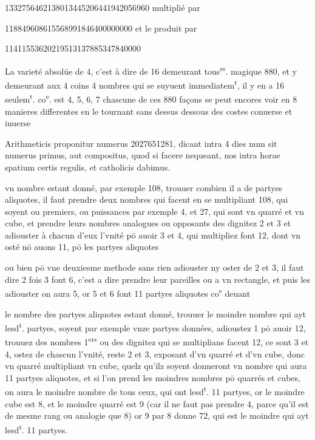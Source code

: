 \documentclass[11pt,a4paper]{article}
\begin{document}
1332756462138013445206441942056960 multiplié par

118849608615568991846400000000 et le produit par

11411553620219513137885347840000

La varieté absolüe de 4, c'est à dire de 16 demeurant tous\textsuperscript{rs}. magique  880, et y demeurant aux 4 coins 4 nombres qui se suyuent immediatem\textsuperscript{t}, il y en a 16 seulem\textsuperscript{t}. co\textsuperscript{e}. est 4, 5, 6, 7 chascune de ces 880 façons se peut encores voir en 8 manieres differentes en le tournant sans dessus dessous des costes conuerse et inuerse

Arithmeticis proponitur numerus 2027651281, dicant intra 4 dies num sit numerus primus, aut compositus, quod si facere nequeant, nos intra horae spatium certis regulis, et catholicis dabimus.

vn nombre estant donné, par exemple 108, trouuer combien il a de partyes aliquotes, il faut prendre deux nombres qui facent en se multipliant 108, qui soyent ou premiers, ou puissances par exemple 4, et 27, qui sont vn quarré et vn cube, et prendre leurs nombres analogues ou opposants des dignitez 2 et 3 et adiouster à chacun d'eux l'vnité pō auoir 3 et 4, qui multipliez font 12, dont vn osté nō auons 11, pō les partyes aliquotes

ou bien pō vne deuxiesme methode sans rien adiouster ny oster de 2 et 3, il faut dire 2 fois 3 font 6, c'est a dire prendre leur pareilles ou a vn rectangle, et puis les adiouster on aura 5, or 5 et 6 font 11 partyes aliquotes co\textsuperscript{e} deuant

le nombre des partyes aliquotes estant donné, trouuer le moindre nombre qui ayt lesd\textsuperscript{t}. partyes, soyent par exemple vnze partyes données, adioustez 1 pō auoir 12, trouuez des nombres 1\textsuperscript{ers} ou des dignitez qui se multiplians facent 12, ce sont 3 et 4, ostez de chascun l'vnité, reste 2 et 3, exposant d'vn quarré et d'vn cube, donc vn quarré multipliant vn cube, quelz qu'ilz soyent donneront vn nombre qui aura 11 partyes aliquotes, et si l'on prend les moindres nombres pō quarrés et cubes, on aura le moindre nombre de tous ceux, qui ont lesd\textsuperscript{t}. 11 partyes, or le moindre cube est 8, et le moindre quarré est 9 (car il ne faut pas prendre 4, parce qu'il est de mesme rang ou analogie que 8) or 9 par 8 donne 72, qui est le moindre qui ayt lesd\textsuperscript{t}. 11 partyes.
\end{document}
